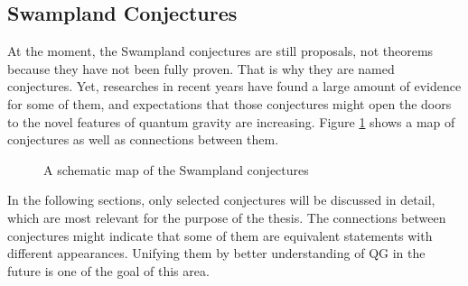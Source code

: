 \subsection{Swampland Conjectures}
At the moment, the Swampland conjectures are still proposals, not theorems because they have not been fully proven. That is why they are named conjectures. Yet, researches in recent years have found a large amount of evidence for some of them, and expectations that those conjectures might open the doors to the novel features of quantum gravity are increasing. Figure \ref{fig:connection} shows a map of conjectures as well as connections between them.
\begin{figure}
    \centering
    \caption{A schematic map of the Swampland conjectures}
    \label{fig:connection}
\end{figure}
In the following sections, only selected conjectures will be discussed in detail, which are most relevant for the purpose of the thesis. The connections between conjectures might indicate that some of them are equivalent statements with different appearances. Unifying them by better understanding of QG in the future is one of the goal of this area.


